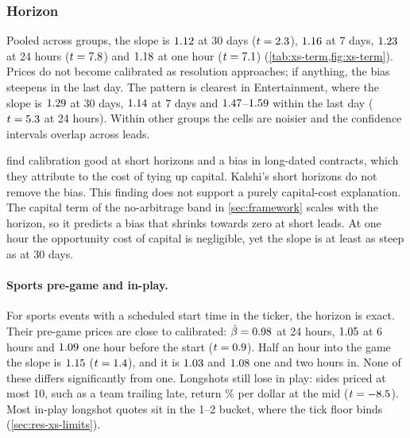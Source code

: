 \subsubsection{Horizon}\label{sec:res-xs-horizon}

Pooled across groups, the slope is $1.12$ at 30 days ($t=2.3$),
$1.16$ at 7 days, $1.23$ at 24 hours ($t=7.8$) and
$1.18$ at one hour ($t=7.1$) (\cref{tab:xs-term,fig:xs-term}). Prices
do not become calibrated as resolution approaches; if anything, the bias steepens in the last day.
The pattern is clearest in Entertainment, where the slope is $1.29$ at 30 days,
$1.14$ at 7 days and $1.47$--$1.59$ within the last
day ($t=5.3$ at 24 hours). Within other groups the cells are noisier and the
confidence intervals overlap across leads.

\citet{pageclemen2013} find calibration good at short horizons and a bias in long-dated contracts,
which they attribute to the cost of tying up capital. Kalshi's short horizons do not remove the bias.
This finding does not support a purely capital-cost explanation. The capital term of the no-arbitrage band
in \cref{sec:framework} scales with the horizon, so it predicts a bias that shrinks towards zero at short
leads. At one hour the opportunity cost of capital is negligible, yet the slope is at least as steep
as at 30 days.

\paragraph{Sports pre-game and in-play.}
For sports events with a scheduled start time in the ticker, the horizon is exact. Their pre-game
prices are close to calibrated: $\hat\beta=0.98$ at 24 hours,
$1.05$ at 6 hours and $1.09$ one hour before the start
($t=0.9$). Half an hour into the game the slope is
$1.15$ ($t=1.4$), and it is
$1.03$ and $1.08$ one and two hours in. None of these
differs significantly from one. Longshots still lose in play: sides priced at most 10\cents{},
such as a team trailing late, return \xsInplayLsMid\% per dollar at the mid ($t=-8.5$).
Most in-play longshot quotes sit in the 1--2\cents{} bucket, where the tick floor binds
(\cref{sec:res-xs-limits}).


